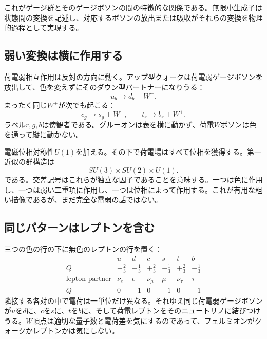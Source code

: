 これがゲージ群とそのゲージボソンの間の特徴的な関係である。無限小生成子は状態間の変換を記述し、対応するボソンの放出または吸収がそれらの変換を物理的過程として実現する。

\subsection{弱い変換は横に作用する}

荷電弱相互作用は反対の方向に動く。アップ型クォークは荷電弱ゲージボソンを放出して、色を変えずにそのダウン型パートナーになりうる：
\begin{equation}
  u_b\longrightarrow d_b+W^+.
\end{equation}
まったく同じ\(W^+\)が次でも起こる：
\begin{equation}
  c_g\longrightarrow s_g+W^+,
  \qquad
  t_r\longrightarrow b_r+W^+.
\end{equation}
ラベル\(r,g,b\)は傍観者である。グルーオンは表を横に動かず、荷電\(W\)ボソンは色を通って縦に動かない。

電磁位相対称性\(U(1)\)を加える。その下で荷電場はすべて位相を獲得する。第一近似の群構造は
\begin{equation}
  SU(3)\times SU(2)\times U(1).
\end{equation}
である。交差記号はこれらが独立な因子であることを意味する。一つは色に作用し、一つは弱い二重項に作用し、一つは位相によって作用する。これが有用な粗い描像であるが、まだ完全な電弱の話ではない。

\subsection{同じパターンはレプトンを含む}

三つの色の行の下に無色のレプトンの行を置く：
\begin{equation}
\begin{array}{c|cc|cc|cc}
 &u&d&c&s&t&b\\ \hline
Q&+\frac23&-\frac13&+\frac23&-\frac13&+\frac23&-\frac13\\
\text{lepton partner}
 &\nu_e&e^-&\nu_\mu&\mu^-&\nu_\tau&\tau^-\\
Q&0&-1&0&-1&0&-1
\end{array}
\end{equation}
隣接する各対の中で電荷は一単位だけ異なる。それゆえ同じ荷電弱ゲージボソンが\(u\)を\(d\)に、\(c\)を\(s\)に、\(t\)を\(b\)に、そして荷電レプトンをそのニュートリノに結びつけうる。\(W\)頂点は適切な量子数と電荷差を気にするのであって、フェルミオンがクォークかレプトンかは気にしない。

